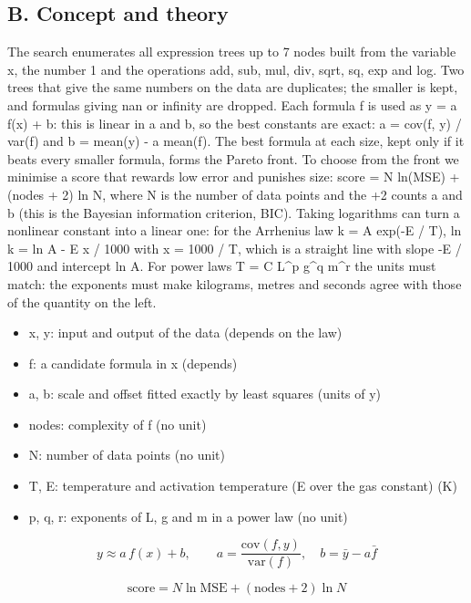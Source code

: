 \documentclass[11pt,a4paper]{article}
\begin{document}
\subsection*{B. Concept and theory}
The search enumerates all expression trees up to 7 nodes built from the variable x, the number 1 and the operations add, sub, mul, div, sqrt, sq, exp and log. Two trees that give the same numbers on the data are duplicates; the smaller is kept, and formulas giving nan or infinity are dropped. Each formula f is used as y = a f(x) + b: this is linear in a and b, so the best constants are exact: a = cov(f, y) / var(f) and b = mean(y) - a mean(f). The best formula at each size, kept only if it beats every smaller formula, forms the Pareto front. To choose from the front we minimise a score that rewards low error and punishes size: score = N ln(MSE) + (nodes + 2) ln N, where N is the number of data points and the +2 counts a and b (this is the Bayesian information criterion, BIC). Taking logarithms can turn a nonlinear constant into a linear one: for the Arrhenius law k = A exp(-E / T), ln k = ln A - E x / 1000 with x = 1000 / T, which is a straight line with slope -E / 1000 and intercept ln A. For power laws T = C L\textasciicircum{}p g\textasciicircum{}q m\textasciicircum{}r the units must match: the exponents must make kilograms, metres and seconds agree with those of the quantity on the left.

\begin{itemize}[nosep]
\item x, y: input and output of the data (depends on the law)
\item f: a candidate formula in x (depends)
\item a, b: scale and offset fitted exactly by least squares (units of y)
\item nodes: complexity of f (no unit)
\item N: number of data points (no unit)
\item T, E: temperature and activation temperature (E over the gas constant) (K)
\item p, q, r: exponents of L, g and m in a power law (no unit)
\end{itemize}

\begin{equation*}
y\approx a\,f(x)+b,\qquad a=\frac{\mathrm{cov}(f,y)}{\mathrm{var}(f)},\quad b=\bar y-a\bar f
\end{equation*}

\begin{equation*}
\mathrm{score}=N\ln\mathrm{MSE}+(\text{nodes}+2)\ln N
\end{equation*}
\end{document}
